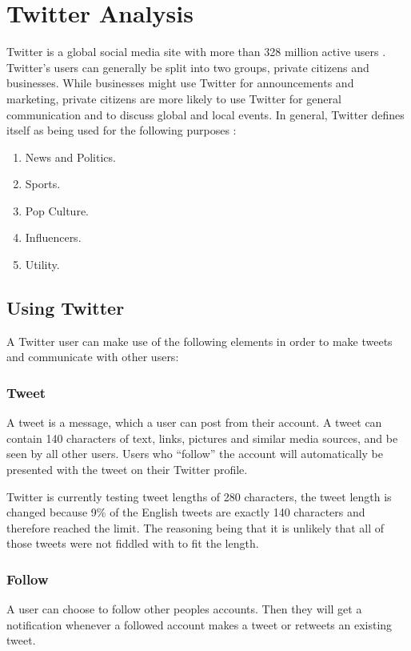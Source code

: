 \section{Twitter Analysis}\label{sec:twitter-analysis}
Twitter is a global social media site with more than 328 million active users
\citep{aboutTwitter} \KT. Twitter's users can generally be split into two
groups, private citizens and businesses. While businesses might use Twitter for
announcements and marketing, private citizens are more likely to use Twitter for
general communication and to discuss global and local events. In general,
Twitter defines itself as being used for the following purposes
\citep{StartingTwitter}:

\begin{enumerate}    
  \item News and Politics.
  \item Sports.
  \item Pop Culture. 
  \item Influencers.
  \item Utility.
\end{enumerate} %

\subsection{Using Twitter}
A Twitter user can make use of the following elements \citep{StartingTwitter}
in order to make tweets and communicate with other users:

\subsubsection{Tweet}
A tweet is a message, which a user can post from their account. A tweet can
contain 140 characters\citep{StartingTwitter2} of text, links, pictures and
similar media sources, and be seen by all other users. Users who ``follow'' the
account will automatically be presented with the tweet on their Twitter profile.

Twitter is currently testing tweet lengths of 280 characters, the tweet length
is changed because 9\% of the English tweets are exactly 140 characters and
therefore reached the limit. The reasoning being that it is unlikely that all of
those tweets were not fiddled with to fit the length\cite{TweetL}.

\subsubsection{Follow}
A user can choose to follow other peoples accounts. Then they will get a
notification whenever a followed account makes a tweet or retweets an existing
tweet.

